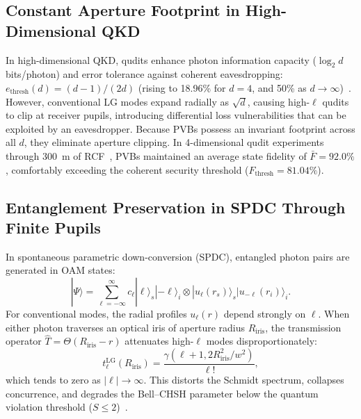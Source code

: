 \documentclass{optica-article}
\begin{document}
\subsection{Constant Aperture Footprint in High-Dimensional QKD}

In high-dimensional QKD, qudits enhance photon information capacity ($\log_2 d$ bits/photon) and error tolerance against coherent eavesdropping: $e_{\text{thresh}}(d) = (d-1)/(2d)$ (rising to 18.96\% for $d=4$, and 50\% as $d \to \infty$)~\cite{Cerf2002,Mirhosseini2015,BennettBrassard1984}. However, conventional LG modes expand radially as $\sqrt{d}$, causing high-$\ell$ qudits to clip at receiver pupils, introducing differential loss vulnerabilities that can be exploited by an eavesdropper. Because PVBs possess an invariant footprint across all $d$, they eliminate aperture clipping. In 4-dimensional qudit experiments through 300~m of RCF~\cite{Villalba2023}, PVBs maintained an average state fidelity of $\bar{F} = 92.0\%$, comfortably exceeding the coherent security threshold ($F_{\text{thresh}} = 81.04\%$).

\subsection{Entanglement Preservation in SPDC Through Finite Pupils}

In spontaneous parametric down-conversion (SPDC), entangled photon pairs are generated in OAM states:
\begin{equation}
|\Psi\rangle = \sum_{\ell=-\infty}^\infty c_\ell |\ell\rangle_s |-\ell\rangle_i \otimes |u_\ell(r_s)\rangle_s |u_{-\ell}(r_i)\rangle_i.
\label{eq:spdc_biphoton_state}
\end{equation}
For conventional modes, the radial profiles $u_\ell(r)$ depend strongly on $\ell$. When either photon traverses an optical iris of aperture radius $R_{\text{iris}}$, the transmission operator $\hat{T} = \Theta(R_{\text{iris}} - r)$ attenuates high-$\ell$ modes disproportionately:
\begin{equation}
t_\ell^{\text{LG}}(R_{\text{iris}}) = \frac{\gamma(\ell+1, 2 R_{\text{iris}}^2 / w^2)}{{\ell}!},
\label{eq:lg_pupil_attenuation}
\end{equation}
which tends to zero as $|\ell| \to \infty$. This distorts the Schmidt spectrum, collapses concurrence, and degrades the Bell--CHSH parameter below the quantum violation threshold ($S \le 2$)~\cite{Clauser1969,LawEberly2004,Walborn2010,Sakurai2020}.
\end{document}
